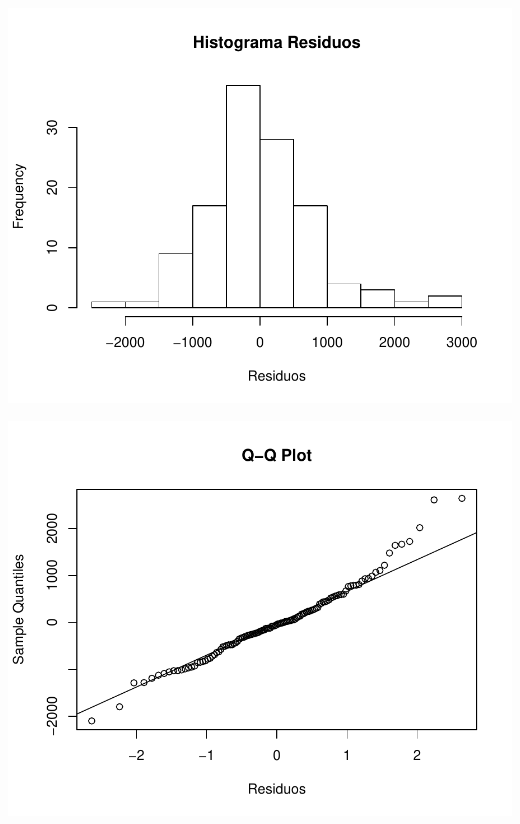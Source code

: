 \documentclass[11pt,a4paper,oneside]{article}\usepackage[]{graphicx}\usepackage[]{color}
\makeatletter
\def\maxwidth{ %
  \ifdim\Gin@nat@width>\linewidth
    \linewidth
  \else
    \Gin@nat@width
  \fi
}
\newenvironment{knitrout}{}{} %
\makeatother
\begin{document}
\begin{knitrout}
{\centering \includegraphics[width=\maxwidth]{figure/unnamed-chunk-16-17} 

}




{\centering \includegraphics[width=\maxwidth]{figure/unnamed-chunk-16-18} 

}





\end{knitrout}
\end{document}
